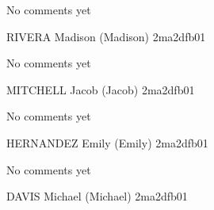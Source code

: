 \documentclass[11pt]{article}
\begin{document}
No comments yet

\newpage

RIVERA Madison (Madison) \hfill 2ma2dfb01 \\

\noindent
\begin{minipage}[t]{0.49\textwidth}
\centering
{}
\end{minipage}
\hfill
\begin{minipage}[t]{0.49\textwidth}
\centering
{}
\end{minipage}

No comments yet

\newpage

MITCHELL Jacob (Jacob) \hfill 2ma2dfb01 \\

\noindent
\begin{minipage}[t]{0.49\textwidth}
\centering
{}
\end{minipage}
\hfill
\begin{minipage}[t]{0.49\textwidth}
\centering
{}
\end{minipage}

No comments yet

\newpage

HERNANDEZ Emily (Emily) \hfill 2ma2dfb01 \\

\noindent
\begin{minipage}[t]{0.49\textwidth}
\centering
{}
\end{minipage}
\hfill
\begin{minipage}[t]{0.49\textwidth}
\centering
{}
\end{minipage}

No comments yet

\newpage

DAVIS Michael (Michael) \hfill 2ma2dfb01 \\

\noindent
\begin{minipage}[t]{0.49\textwidth}
\centering
{}
\end{minipage}
\hfill
\begin{minipage}[t]{0.49\textwidth}
\centering
{}
\end{minipage}
\end{document}
